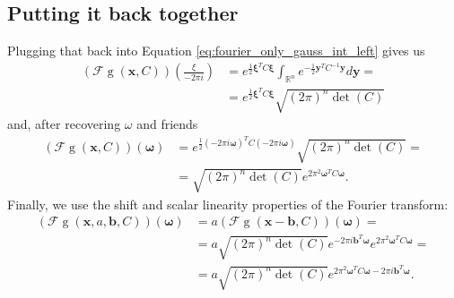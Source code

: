 \documentclass{paper}
\newcommand{\F}{\ensuremath{\mathcal{F}}}
\newcommand{\vr}[1]{\ensuremath{\boldsymbol{#1}}}
\newcommand{\f}[1]{\operatorname{#1}}
\newcommand{\omegavec}[0]{\ensuremath{\vr{\omega{}}}}
\newcommand{\xivec}[0]{\ensuremath{\vr{\xi{}}}}
\newcommand{\bvec}[0]{\ensuremath{\vr{b}}}
\newcommand{\yvec}[0]{\ensuremath{\vr{y}}}
\begin{document}
\subsection{Putting it back together}
Plugging that back into Equation \ref{eq:fourier_only_gauss_int_left} gives us
\begin{align*}
	(\F\f{g}(\vr{x}, C))(\frac{\xi}{-2 \pi i})
	&= e^{\frac{1}{2} \xivec^T C \xivec} \int_{\mathbb{R}^n} e^{-\frac{1}{2} \yvec^T C^{-1} \yvec}  d\yvec = \\
	&= e^{\frac{1}{2} \xivec^T C \xivec} \sqrt{(2 \pi)^n \f{det}(C)}
\end{align*}
and, after recovering $\omega$ and friends
\begin{align*}
(\F\f{g}(\vr{x}, C))(\omegavec)
&= e^{\frac{1}{2} (-2 \pi i \omegavec)^T C (-2 \pi i \omegavec)} \sqrt{(2 \pi)^n \f{det}(C)} = \\
&= \sqrt{(2 \pi)^n \f{det}(C)} e^{2 \pi^2 \omegavec^T C \omegavec}.
\end{align*}
Finally, we use the shift and scalar linearity properties of the Fourier transform:
\begin{align}
(\F\f{g}(\vr{x}, a, \bvec, C))(\omegavec) &= a (\F\f{g}(\vr{x} - \bvec, C))(\omegavec) = \nonumber \\
&= a \sqrt{(2 \pi)^n \f{det}(C)} e^{-2\pi i \bvec^T \omegavec} e^{2 \pi^2 \omegavec^T C \omegavec} =\nonumber \\
\label{eq:gaussian_fourier_transform}
&= a \sqrt{(2 \pi)^n \f{det}(C)} e^{2 \pi^2 \omegavec^T C \omegavec - 2\pi i \bvec^T \omegavec}.
\end{align}
\end{document}
